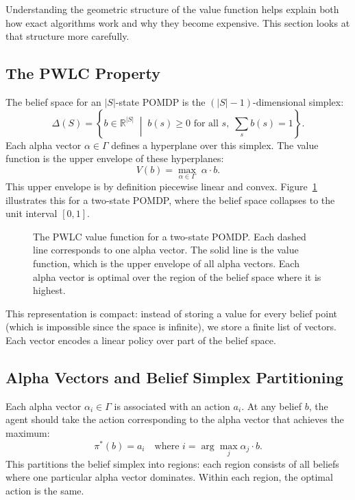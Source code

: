 Understanding the geometric structure of the value function helps explain both how exact algorithms work and why they become expensive.
This section looks at that structure more carefully.


\subsection{The PWLC Property}

The belief space for an $|S|$-state POMDP is the $(|S|-1)$-dimensional simplex:
\begin{equation}
  \Delta(S) = \left\{ b \in \mathbb{R}^{|S|} \;\middle|\; b(s) \geq 0 \text{ for all } s,\; \sum_{s} b(s) = 1 \right\}.
\end{equation}
Each alpha vector $\alpha \in \Gamma$ defines a hyperplane over this simplex.
The value function is the upper envelope of these hyperplanes:
\begin{equation}
  V(b) = \max_{\alpha \in \Gamma}\; \alpha \cdot b.
\end{equation}
This upper envelope is by definition piecewise linear and convex.
Figure~\ref{fig:pwlc} illustrates this for a two-state POMDP, where the belief space collapses to the unit interval $[0,1]$.

\begin{figure}[htbp]
  \centering
  
  \caption{
    The PWLC value function for a two-state POMDP.
    Each dashed line corresponds to one alpha vector.
    The solid line is the value function, which is the upper envelope of all alpha vectors.
    Each alpha vector is optimal over the region of the belief space where it is highest.
  }
  \label{fig:pwlc}
\end{figure}

This representation is compact: instead of storing a value for every belief point (which is impossible since the space is infinite), we store a finite list of vectors.
Each vector encodes a linear policy over part of the belief space.


\subsection{Alpha Vectors and Belief Simplex Partitioning}

Each alpha vector $\alpha_i \in \Gamma$ is associated with an action $a_i$.
At any belief $b$, the agent should take the action corresponding to the alpha vector that achieves the maximum:
\begin{equation}
  \pi^*(b) = a_i \quad \text{where } i = \arg\max_{j} \alpha_j \cdot b.
\end{equation}
This partitions the belief simplex into regions: each region consists of all beliefs where one particular alpha vector dominates.
Within each region, the optimal action is the same.

